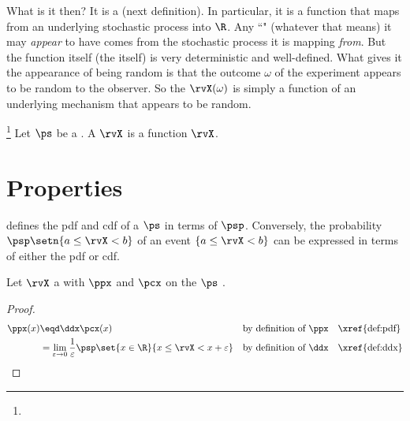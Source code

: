 What is it then? It is a  (next definition).
In particular, it is a function that maps from an underlying stochastic process into $\R$.
Any ``" (whatever that means) it may \emph{appear} to have comes from the stochastic process it
is mapping \emph{from}. But the function itself (the  itself) is very deterministic and well-defined.
What gives it the appearance of being random is that the outcome $\omega$
of the experiment appears to be random to the observer.
So the  $\rvX(\omega)$ is simply a function of an underlying
mechanism that appears to be random.
\begin{definition}
\footnote{
  }
Let $\ps$ be a  .
A  $\rvX$ is a function $\rvX$.
\end{definition}


\section{Properties}
 defines the pdf and cdf of a 
$\ps$ in terms of  $\psp$.
Conversely, the probability  $\psp\setn{a\le\rvX<b}$
of an event $\{a\le\rvX<b\}$ can be
expressed in terms of either the pdf or cdf.

\begin{proposition}
\label{prop:pdfddx}
Let $\rvX$ a  with  $\ppx$ and  $\pcx$
 on the  $\ps$ .\\
\end{proposition}
\begin{proof}
\begin{align*}
  \ppx(x)
    &\eqd \ddx\pcx(x)
    && \text{by definition of $\ppx$}
    && \text{\xref{def:pdf}}
  \\&=    \lim_{\varepsilon\to 0} \frac{1}{\varepsilon}\psp\set{x\in\R}{x \le \rvX < x+\varepsilon}
    && \text{by definition of $\ddx$}
    && \text{\xref{def:ddx}}
\end{align*}
\end{proof}

